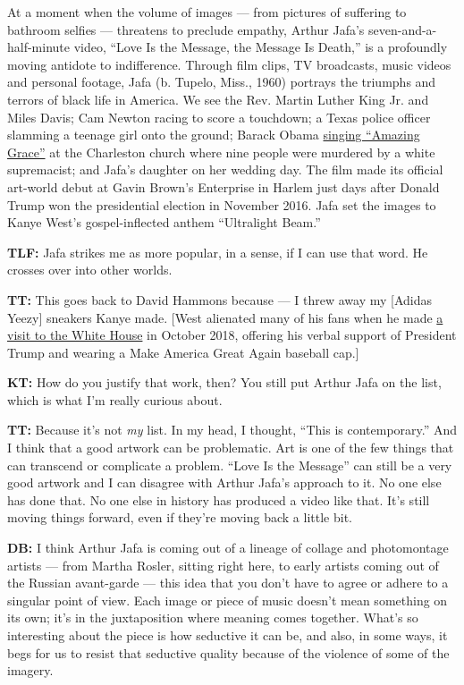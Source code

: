 At a moment when the volume of images --- from pictures of suffering to
bathroom selfies --- threatens to preclude empathy, Arthur Jafa's
seven-and-a-half-minute video, ``Love Is the Message, the Message Is
Death,'' is a profoundly moving antidote to indifference. Through film
clips, TV broadcasts, music videos and personal footage, Jafa (b.
Tupelo, Miss., 1960) portrays the triumphs and terrors of black life in
America. We see the Rev. Martin Luther King Jr. and Miles Davis; Cam
Newton racing to score a touchdown; a Texas police officer slamming a
teenage girl onto the ground; Barack Obama
\href{https://www.nytimes.com/2015/07/04/arts/obamas-eulogy-which-found-its-place-in-history.html}{singing
``Amazing Grace''} at the Charleston church where nine people were
murdered by a white supremacist; and Jafa's daughter on her wedding day.
The film made its official art-world debut at Gavin Brown's Enterprise
in Harlem just days after Donald Trump won the presidential election in
November 2016. Jafa set the images to Kanye West's gospel-inflected
anthem ``Ultralight Beam.''

\textbf{TLF:} Jafa strikes me as more popular, in a sense, if I can use
that word. He crosses over into other worlds.

\textbf{TT:} This goes back to David Hammons because --- I threw away my
{[}Adidas Yeezy{]} sneakers Kanye made. {[}West alienated many of his
fans when he made
\href{https://www.nytimes.com/2018/10/11/us/politics/kanye-trump-white-house-monologue.html}{a
visit to the White House} in October 2018, offering his verbal support
of President Trump and wearing a Make America Great Again baseball
cap.{]}

\textbf{KT:} How do you justify that work, then? You still put Arthur
Jafa on the list, which is what I'm really curious about.

\textbf{TT:} Because it's not \emph{my} list. In my head, I thought,
``This is contemporary.'' And I think that a good artwork can be
problematic. Art is one of the few things that can transcend or
complicate a problem. ``Love Is the Message'' can still be a very good
artwork and I can disagree with Arthur Jafa's approach to it. No one
else has done that. No one else in history has produced a video like
that. It's still moving things forward, even if they're moving back a
little bit.

\textbf{DB:} I think Arthur Jafa is coming out of a lineage of collage
and photomontage artists --- from Martha Rosler, sitting right here, to
early artists coming out of the Russian avant-garde --- this idea that
you don't have to agree or adhere to a singular point of view. Each
image or piece of music doesn't mean something on its own; it's in the
juxtaposition where meaning comes together. What's so interesting about
the piece is how seductive it can be, and also, in some ways, it begs
for us to resist that seductive quality because of the violence of some
of the imagery.


